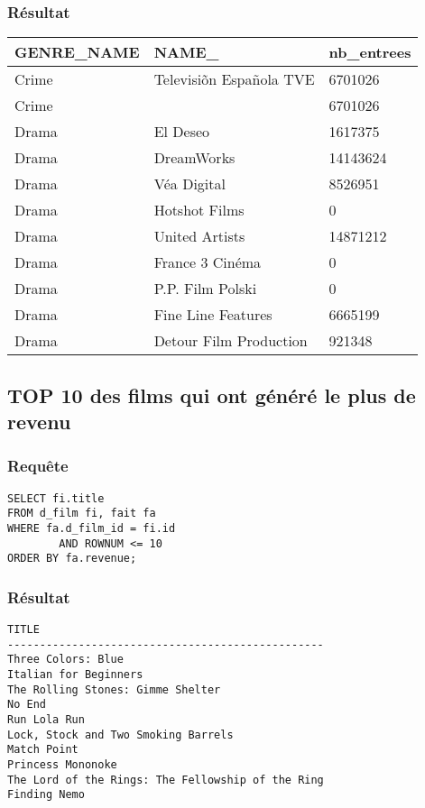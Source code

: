 \subsubsection{Résultat}
\begin{table}[H]
	\centering
	\begin{tabular}{ l  l  l }
		GENRE\_NAME  &  NAME\_      &  nb\_entrees \\
		\hline
Crime  &  Televisiõn Española TVE	 &  6701026 \\ 
Crime  & 								 &  6701026 \\ 
Drama  &  El Deseo					 &  1617375 \\ 
Drama  &  DreamWorks					 &  14143624 \\ 
Drama  &  Véa Digital				 &  8526951 \\ 
Drama  &  Hotshot Films				 &  0 \\ 
Drama  &  United Artists				 &  14871212 \\ 
Drama  &  France 3 Cinéma			 &  0 \\ 
Drama  &  P.P. Film Polski			 &  0 \\ 
Drama  &  Fine Line Features			 &  6665199 \\ 
Drama  &  Detour Film Production		 &  921348 \\ 
	\end{tabular}
\end{table}


\subsection{TOP 10 des films qui ont généré le plus de revenu}
\subsubsection{Requête}
\begin{lstlisting}
SELECT fi.title
FROM d_film fi, fait fa
WHERE fa.d_film_id = fi.id
		AND ROWNUM <= 10
ORDER BY fa.revenue;
\end{lstlisting}

\subsubsection{Résultat}
\begin{lstlisting}
TITLE
-------------------------------------------------
Three Colors: Blue
Italian for Beginners
The Rolling Stones: Gimme Shelter
No End
Run Lola Run
Lock, Stock and Two Smoking Barrels
Match Point
Princess Mononoke
The Lord of the Rings: The Fellowship of the Ring
Finding Nemo

\end{lstlisting}

